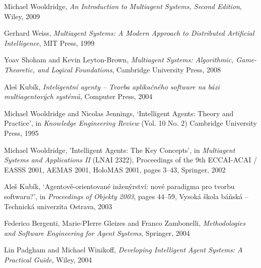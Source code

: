 \begin{thebibliography}{99}


Michael Wooldridge,
\textit{An Introduction to Multiagent Systems, Second Edition},
Wiley, 2009

Gerhard Weiss,
\textit{Multiagent Systems: A Modern Approach to Distributed Artificial Intelligence},
MIT Press, 1999

Yoav Shoham and Kevin Leyton-Brown,
\textit{Multiagent Systems: Algorithmic, Game-Theoretic, and Logical Foundations},
Cambridge University Press, 2008


Aleš Kubík,
\textit{Inteligentní agenty -- Tvorba aplikačného software na bázi multiagentových systémů},
Computer Press, 2004

Michael Wooldridge and Nicolas Jennings,
`Intelligent Agents: Theory and Practice',
in \textit{Knowledge Engineering Review} (Vol. 10 No. 2)
Cambridge University Press, 1995

Michael Wooldridge,
'Intelligent Agents: The Key Concepts',
in \textit{Multiagent Systems and Applications II} (LNAI 2322),
Proceedings of the 9th ECCAI-ACAI / EASSS 2001, AEMAS 2001, HoloMAS 2001,
pages 3--43,
Springer, 2002 

Aleš Kubík,
`Agentově-orientované inženýrství: nové paradigma pro tvorbu softwaru?',
in \textit{Proceedings of Objekty 2003},
pages 44--59,
Vysoká škola báňská – Technická univerzita Ostrava, 2003


Federico Bergenti, Marie-PIerre Gleizes and Franco Zambonelli,
\textit{Methodologies and Software Engineering for Agent Systems},
Springer, 2004

Lin Padgham and Michael Winikoff,
\textit{Developing Intelligent Agent Systems: A Practical Guide},
Wiley, 2004



\end{thebibliography}
